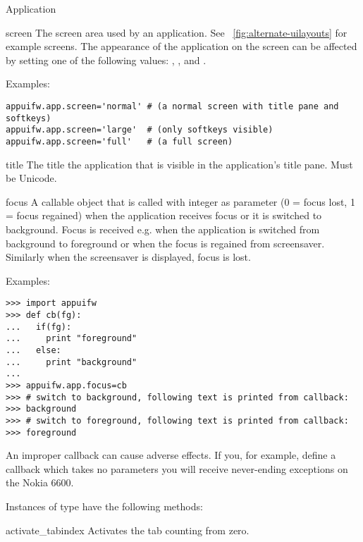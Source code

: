 \begin{classdesc*}{Application}
\begin{memberdesc}[Application]{screen}
The screen area used by an application. See \figurename~\ref{fig:alternate-uilayouts} for
example screens. The appearance of the application on the screen can
be affected by setting one of the following values: ,
, and .

Examples:
\begin{verbatim}
appuifw.app.screen='normal' # (a normal screen with title pane and softkeys)
appuifw.app.screen='large'  # (only softkeys visible)
appuifw.app.screen='full'   # (a full screen)
\end{verbatim}
\end{memberdesc}

\begin{memberdesc}[Application]{title}
The title the application that is visible in the application's title
pane. Must be Unicode.
\end{memberdesc}

\begin{memberdesc}[Application]{focus}
A callable object that is called with integer as parameter (0 = focus lost, 
1 = focus regained) when the application receives focus or it is switched to 
background. Focus is received e.g. when the application is switched from 
background to foreground or when the focus is regained from screensaver. 
Similarly when the screensaver is displayed, focus is lost.

Examples:
\begin{verbatim}
>>> import appuifw
>>> def cb(fg):
...   if(fg):
...     print "foreground"
...   else:
...     print "background"
...
>>> appuifw.app.focus=cb
>>> # switch to background, following text is printed from callback:
>>> background
>>> # switch to foreground, following text is printed from callback:
>>> foreground
\end{verbatim}

\begin{notice}
An improper callback can cause adverse effects. If you, for example,
define a callback which takes no parameters you will receive
never-ending  exceptions on the Nokia 6600.
\end{notice}

\end{memberdesc}

Instances of  type have the following methods:

\begin{methoddesc}[Application]{activate_tab}{index}
Activates the tab  counting from zero.
\end{methoddesc}


\end{classdesc*}
